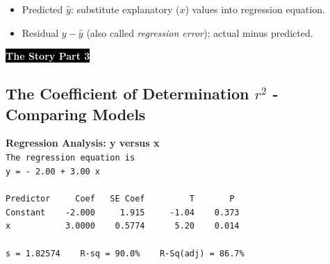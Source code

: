 \documentclass[9pt, oneside]{extarticle}     %
\begin{document}
  \begin{itemize}
    \item Predicted $\hat{y}$: substitute explanatory ($x$) values into regression equation.
    \item Residual $y-\hat{y}$ (also called {\em regression error}); actual minus predicted.
  \end{itemize}

%


\newpage


  \colorbox{black}{{\bf \textcolor{white}{\textsf{The Story Part 3}}}}\\


  \subsection{The Coefficient of Determination $r^2$ - Comparing Models} %
  \label{sub:subsection_name}


    {\bf Regression Analysis: y versus x}\\
    \verb|The regression equation is|\\
    \verb|y = - 2.00 + 3.00 x|\\
    \verb||\\
    \verb|Predictor     Coef   SE Coef         T       P|\\
    \verb|Constant    -2.000     1.915     -1.04    0.373|\\
    \verb|x           3.0000    0.5774      5.20    0.014|\\
    \verb||\\
    \verb|s = 1.82574    R-sq = 90.0%    R-Sq(adj) = 86.7%|
    \verb||\\
\end{document}
